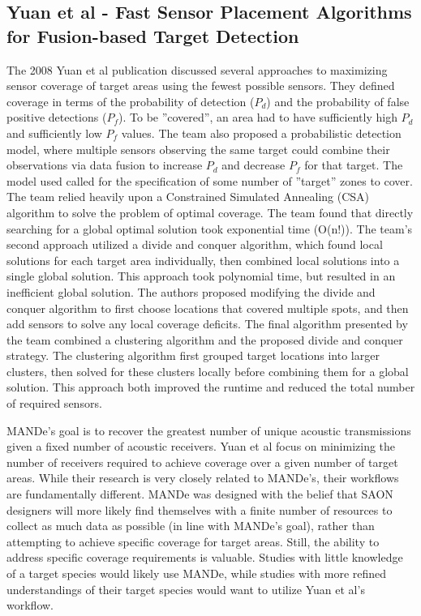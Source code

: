 \subsection{Yuan et al - Fast Sensor Placement Algorithms for Fusion-based Target Detection}
The 2008 Yuan et al publication discussed several approaches to maximizing sensor coverage of target areas using the fewest possible sensors.  They defined coverage in terms of the probability of detection ($P_d$) and the probability of false positive detections ($P_f$).  To be ''covered'', an area had to have sufficiently high $P_d$ and sufficiently low $P_f$ values.  The team also proposed a probabilistic detection model, where multiple sensors observing the same target could combine their observations via  data fusion to increase $P_d$ and decrease $P_f$ for that target. The model used called for the specification of some number of ''target'' zones to cover.  The team relied heavily upon a Constrained Simulated Annealing (CSA) algorithm to solve the problem of optimal coverage.  The team found that directly searching for a global optimal solution took exponential time (O(n!)).  The team's second approach utilized a divide and conquer algorithm, which found local solutions for each target area individually, then combined local solutions into a single global solution.  This approach took polynomial time, but resulted in an inefficient global solution.  The authors proposed modifying the divide and conquer algorithm to first choose locations that covered multiple spots, and then add sensors to solve any local coverage deficits.  The final algorithm presented by the team combined a clustering algorithm and the proposed divide and conquer strategy.  The clustering algorithm first grouped target locations into larger clusters, then solved for these clusters locally before combining them for a global solution.  This approach both improved the runtime and reduced the total number of required sensors.

MANDe's goal is to recover the greatest number of unique acoustic transmissions given a fixed number of acoustic receivers.  Yuan et al focus on minimizing the number of receivers required to achieve coverage over a given number of target areas.  While their research is very closely related to MANDe's, their workflows are fundamentally different.  MANDe was designed with the belief that SAON designers will more likely find themselves with a finite number of resources to collect as much data as possible (in line with MANDe's goal), rather than attempting to achieve specific coverage for target areas.  Still, the ability to address specific coverage requirements is valuable.  Studies with little knowledge of a target species would likely use MANDe, while studies with more refined understandings of their target species would want to utilize Yuan et al's workflow.  


